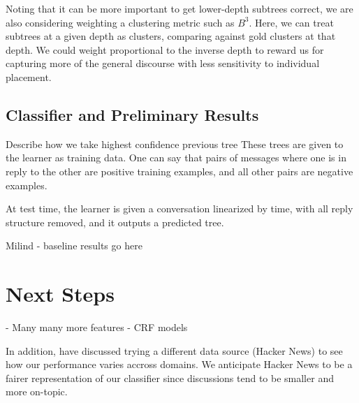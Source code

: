 \documentclass[10pt]{article}
\begin{document}
Noting that it can be more important to get lower-depth subtrees correct, we
are also considering weighting a clustering metric such as $B^3$. Here, we can
treat subtrees at a given depth as clusters, comparing against gold clusters at
that depth. We could weight proportional to the inverse depth to reward us for
capturing more of the general discourse with less sensitivity to individual placement.

\subsection{Classifier and Preliminary Results}
\label{sec:classifier}
{Describe how we take highest confidence previous tree}
These trees are given to the learner as training data. One can say that
pairs of messages where one is in reply to the other are positive training
examples, and all other pairs are negative examples.

At test time, the learner is given a conversation linearized by time, with all
reply structure removed, and it outputs a predicted tree.

{Milind - baseline results go here}

\section{Next Steps}
- Many many more features
- CRF models~\cite{Wang2011a}

In addition, have discussed trying a different data source (Hacker News) to
see how our performance varies accross domains. We anticipate Hacker News
to be a fairer representation of our classifier since discussions tend to be 
smaller and more on-topic.

{} 

\end{document}
